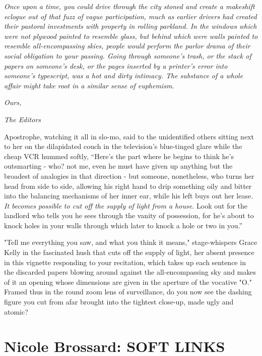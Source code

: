 \documentclass[
]{memoir}
\begin{document}
\emph{Once upon a time, you could drive through the city stoned and
create a makeshift eclogue out of that fuzz of vague participation, much
as earlier drivers had created their pastoral investments with property
in rolling parkland. In the windows which were not plywood painted to
resemble glass, but behind which were walls painted to resemble
all-encompassing skies, people would perform the parlor drama of their
social obligation to your passing. Going through someone's trash, or the
stack of papers on someone's desk, or the pages inserted by a printer's
error into someone's typescript, was a hot and dirty intimacy. The
substance of a whole affair might take root in a similar sense of
euphemism.}

\emph{Ours,}

\emph{The Editors}

Apostrophe, watching it all in slo-mo, said to the unidentified others
sitting next to her on the dilapidated couch in the television's
blue-tinged glare while the cheap VCR hummed softly, ``Here's the part
where he begins to think he's outsmarting - who? not me, even he must
have given up anything but the broadest of analogies in that direction -
but someone, nonetheless, who turns her head from side to side, allowing
his right hand to drip something oily and bitter into the balancing
mechanisms of her inner ear, while his left buys out her lease. \emph{It
becomes possible to cut off the supply of light from a house.} Look out
for the landlord who tells you he sees through the vanity of possession,
for he's about to knock holes in your walls through which later to knock
a hole or two in you.''

"Tell me everything you saw, and what you think it means,"
stage-whispers Grace Kelly in the fascinated hush that cuts off the
supply of light, her absent presence in this vignette responding to your
recitation, which takes up each sentence in the discarded papers blowing
around against the all-encompassing sky and makes of it an opening whose
dimensions are given in the aperture of the vocative "O." Framed thus in
the round zoom lens of surveillance, do you now see the dashing figure
you cut from afar brought into the tightest close-up, made ugly and
atomic?

\hypertarget{nicole-brossard-soft-links}{%
\chapter{Nicole Brossard: SOFT LINKS}\label{nicole-brossard-soft-links}}
\end{document}
